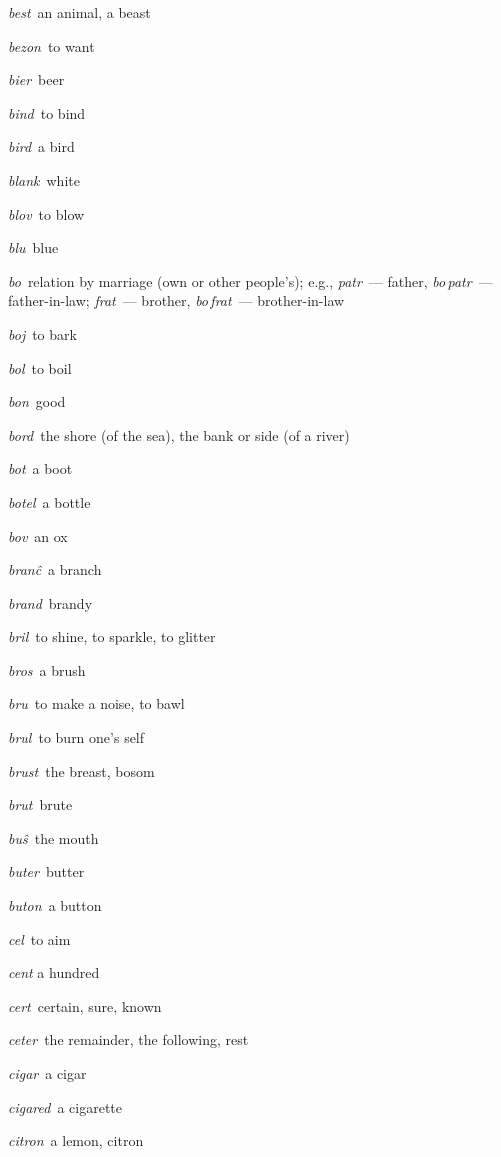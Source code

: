 \begin{landscape}
\begin{multicols}{5}
\begin{outdent}{1em}
\emph{best\,} an animal, a beast

\emph{bezon\,} to want

\emph{bier\,} beer

\emph{bind\,} to bind

\emph{bird\,} a bird

\emph{blank\,} white

\emph{blov\,} to blow

\emph{blu\,} blue

\emph{bo\,} relation by marriage (own or other people’s); e.g., \emph{patr\,} — father, \emph{bo\,patr\,} — father-in-law; \emph{frat\,} — brother, \emph{bo\,frat\,} — brother-in-law

\emph{boj\,} to bark

\emph{bol\,} to boil

\emph{bon\,} good

\emph{bord\,} the shore (of the sea), the bank or side (of a river)

\emph{bot\,} a boot

\emph{botel\,} a bottle

\emph{bov\,} an ox

\emph{branĉ\,} a branch

\emph{brand\,} brandy

\emph{bril\,} to shine, to sparkle, to glitter

\emph{bros\,} a brush

\emph{bru\,} to make a noise, to bawl

\emph{brul\,} to burn one’s self

\emph{brust\,} the breast, bosom

\emph{brut\,} brute

\emph{buŝ\,} the mouth

\emph{buter\,} butter

\emph{buton\,} a button
\end{outdent}


\begin{outdent}{1em}
\emph{cel\,} to aim

\emph{cent} a hundred

\emph{cert\,} certain, sure, known

\emph{ceter\,} the remainder, the following, rest

\emph{cigar\,} a cigar

\emph{cigared\,} a cigarette

\emph{citron\,} a lemon, citron
\end{outdent}


\end{multicols}
\end{landscape}
